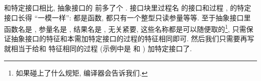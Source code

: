 和特定接口相比, 抽象接口的  前多了个 . 接口块里过程名  的接口和过程 ,  的特定接口长得 ``一模一样'': 都是函数, 都只有一个整型只读参量等等. 至于抽象接口里函数名是 , 参量名是 , 结果名是 , 无关紧要, 这些名称都是可以随便取的\footnote{如果碰上了什么规矩, 编译器会告诉我们.}, 只需保证抽象接口的特征和本需加特定接口的过程的特征相同即可. 然后我们只需要再写  就相当于给和  特征相同的过程  (示例中是  和 ) 加特定接口了.
